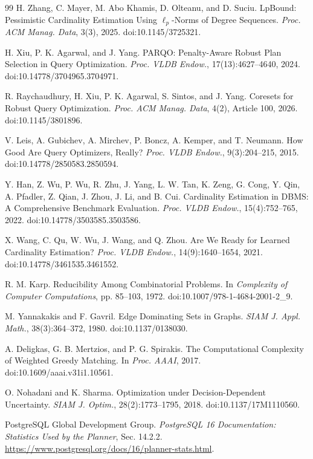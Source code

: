 \documentclass[sigconf, nonacm]{acmart}
\begin{document}
\begin{thebibliography}{99}
H. Zhang, C. Mayer, M. Abo Khamis, D. Olteanu, and D. Suciu.
LpBound: Pessimistic Cardinality Estimation Using
\(\ell_p\)-Norms of Degree Sequences.
\emph{Proc. ACM Manag. Data}, 3(3), 2025.
doi:10.1145/3725321.

H. Xiu, P. K. Agarwal, and J. Yang.
PARQO: Penalty-Aware Robust Plan Selection in Query Optimization.
\emph{Proc. VLDB Endow.}, 17(13):4627--4640, 2024.
doi:10.14778/3704965.3704971.

R. Raychaudhury, H. Xiu, P. K. Agarwal, S. Sintos, and J. Yang.
Coresets for Robust Query Optimization.
\emph{Proc. ACM Manag. Data}, 4(2), Article 100, 2026.
doi:10.1145/3801896.

V. Leis, A. Gubichev, A. Mirchev, P. Boncz, A. Kemper, and T. Neumann.
How Good Are Query Optimizers, Really?
\emph{Proc. VLDB Endow.}, 9(3):204--215, 2015.
doi:10.14778/2850583.2850594.

Y. Han, Z. Wu, P. Wu, R. Zhu, J. Yang, L. W. Tan, K. Zeng, G. Cong,
Y. Qin, A. Pfadler, Z. Qian, J. Zhou, J. Li, and B. Cui.
Cardinality Estimation in DBMS: A Comprehensive Benchmark Evaluation.
\emph{Proc. VLDB Endow.}, 15(4):752--765, 2022.
doi:10.14778/3503585.3503586.

X. Wang, C. Qu, W. Wu, J. Wang, and Q. Zhou.
Are We Ready for Learned Cardinality Estimation?
\emph{Proc. VLDB Endow.}, 14(9):1640--1654, 2021.
doi:10.14778/3461535.3461552.

R. M. Karp.
Reducibility Among Combinatorial Problems.
In \emph{Complexity of Computer Computations},
pp. 85--103, 1972.
doi:10.1007/978-1-4684-2001-2\_9.

M. Yannakakis and F. Gavril.
Edge Dominating Sets in Graphs.
\emph{SIAM J. Appl. Math.}, 38(3):364--372, 1980.
doi:10.1137/0138030.

A. Deligkas, G. B. Mertzios, and P. G. Spirakis.
The Computational Complexity of Weighted Greedy Matching.
In \emph{Proc. AAAI}, 2017.
doi:10.1609/aaai.v31i1.10561.

O. Nohadani and K. Sharma.
Optimization under Decision-Dependent Uncertainty.
\emph{SIAM J. Optim.}, 28(2):1773--1795, 2018.
doi:10.1137/17M1110560.

PostgreSQL Global Development Group.
\emph{PostgreSQL 16 Documentation: Statistics Used by the Planner},
Sec. 14.2.2.
\url{https://www.postgresql.org/docs/16/planner-stats.html}.
\end{thebibliography}
\end{document}
